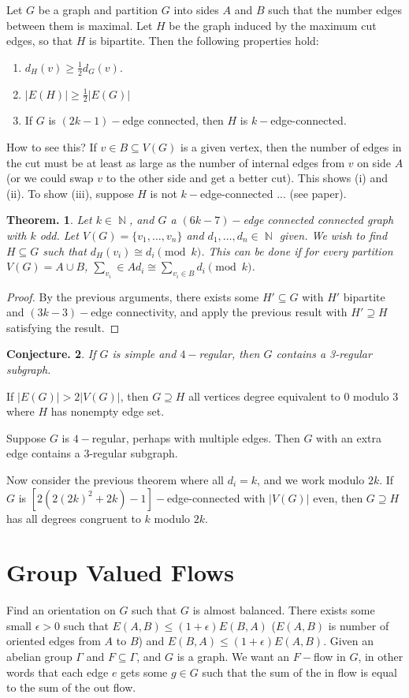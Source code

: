 \documentclass[11pt, a4paper]{memoir}
\DeclareMathOperator{\N}{{\mathbb{N}}}
\theoremstyle{change}
\newtheorem{theorem}{Theorem.}[section]
\newtheorem{conjecture}[theorem]{Conjecture.}
\theoremstyle{plain}
\theoremstyle{nonumberplain}
\newtheorem{proof}{Proof}
\numberwithin{equation}{section}
\begin{document}
Let $G$ be a graph and partition $G$ into sides $A$ and $B$ such that the number edges between them is maximal.
Let $H$ be the graph induced by the maximum cut edges, so that $H$ is bipartite.
Then the following properties hold:
\begin{enumerate}[nl,r]
    \item $d_H(v)\geq\frac{1}{2}d_G(v)$.
    \item $|E(H)|\geq\frac{1}{2}|E(G)|$
    \item If $G$ is $(2k-1)-$edge connected, then $H$ is $k-$edge-connected.
\end{enumerate}
How to see this?
If $v\in B\subseteq V(G)$ is a given vertex, then the number of edges in the cut must be at least as large as the number of internal edges from $v$ on side $A$ (or we could swap $v$ to the other side and get a better cut).
This shows (i) and (ii).
To show (iii), suppose $H$ is not $k-$edge-connected ... (see paper).
\begin{theorem}
    Let $k\in\N$, and $G$ a $(6k-7)-$edge connected connected graph with $k$ odd.
    Let $V(G)=\{v_1,\ldots,v_n\}$ and $d_1,\ldots,d_n\in\N$ given.
    We wish to find $H\subseteq G$ such that $d_H(v_i)\cong d_i\pmod{k}$.
    This can be done if for every partition $V(G)=A\cup B$, $\sum_{v_i}\in A d_i\cong\sum_{v_i\in B}d_i\pmod{k}$.
\end{theorem}
\begin{proof}
    By the previous arguments, there exists some $H'\subseteq G$ with $H'$ bipartite and $(3k-3)-$edge connectivity, and apply the previous result with $H'\supseteq H$ satisfying the result.
\end{proof}
\begin{conjecture}
    If $G$ is simple and $4-$regular, then $G$ contains a 3-regular subgraph.
\end{conjecture}
If $|E(G)|>2|V(G)|$, then $G\supseteq H$ all vertices degree equivalent to 0 modulo 3 where $H$ has nonempty edge set.

Suppose $G$ is $4-$regular, perhaps with multiple edges.
Then $G$ with an extra edge contains a 3-regular subgraph.

Now consider the previous theorem where all $d_i=k$, and we work modulo $2k$.
If $G$ is $[2(2(2k)^2+2k)-1]-$edge-connected with $|V(G)|$ even, then $G\supseteq H$ has all degrees congruent to $k$ modulo $2k$.

\section{Group Valued Flows}
Find an orientation on $G$ such that $G$ is almost balanced.
There exists some small $\epsilon>0$ such that $E(A,B)\leq(1+\epsilon) E(B,A)$ ($E(A,B)$ is number of oriented edges from $A$ to $B$) and $E(B,A)\leq (1+\epsilon)E(A,B)$.
Given an abelian group $\Gamma$ and $F\subseteq\Gamma$, and $G$ is a graph.
We want an $F-$flow in $G$, in other words that each edge $e$ gets some $g\in G$ such that the sum of the in flow is equal to the sum of the out flow.
\end{document}
